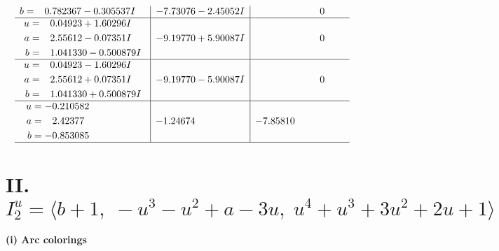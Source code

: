 \documentclass[1p]{elsarticle_modified}
\theoremstyle{definition}
\begin{document}
$$\begin{array}{c|c|c}
\begin{aligned}
b &= \phantom{-}0.782367 - 0.305537 I\end{aligned}
 & -7.73076 - 2.45052 I & \phantom{-0.000000 } 0 \\ \hline\begin{aligned}
u &= \phantom{-}0.04923 + 1.60296 I \\
a &= \phantom{-}2.55612 - 0.07351 I \\
b &= \phantom{-}1.041330 - 0.500879 I\end{aligned}
 & -9.19770 + 5.90087 I & \phantom{-0.000000 } 0 \\ \hline\begin{aligned}
u &= \phantom{-}0.04923 - 1.60296 I \\
a &= \phantom{-}2.55612 + 0.07351 I \\
b &= \phantom{-}1.041330 + 0.500879 I\end{aligned}
 & -9.19770 - 5.90087 I & \phantom{-0.000000 } 0 \\ \hline\begin{aligned}
u &= -0.210582\phantom{ +0.000000I} \\
a &= \phantom{-}2.42377\phantom{ +0.000000I} \\
b &= -0.853085\phantom{ +0.000000I}\end{aligned}
 & -1.24674\phantom{ +0.000000I} & -7.85810\phantom{ +0.000000I}\\
 \hline 
 \end{array}$$\newpage\newpage\renewcommand{\arraystretch}{1}
\centering \section*{II. $I^u_{2}= \langle b+1,\;- u^3- u^2+a-3 u,\;u^4+u^3+3 u^2+2 u+1 \rangle$}
\flushleft \textbf{(i) Arc colorings}\\
\end{document}
